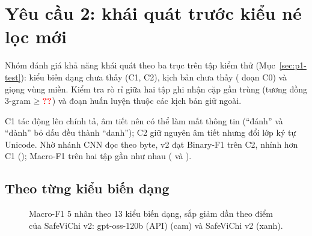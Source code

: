\section{Yêu cầu 2: khái quát trước kiểu né lọc mới}
\label{sec:yc2}

Nhóm đánh giá khả năng khái quát theo ba trục trên tập kiểm thử (Mục~\ref{sec:p1-test}): kiểu biến dạng chưa thấy
(C1, C2), kịch bản chưa thấy ( đoạn C0) và giọng vùng miền. Kiểm tra rò rỉ giữa hai tập ghi nhận  cặp gần trùng (tương đồng 3-gram $\ge \so{rr.nguong}$) và  đoạn
huấn luyện thuộc các kịch bản giữ ngoài.

C1 tác động lên chính tả, âm tiết nên có thể làm mất thông tin (``đánh'' và ``dành'' bỏ dấu đều thành ``danh''); C2
giữ nguyên âm tiết nhưng đổi lớp ký tự Unicode. Nhờ nhánh CNN đọc theo byte, v2 đạt Binary-F1  trên C2,
nhỉnh hơn C1 (); Macro-F1 trên hai tập gần như nhau ( và ).

\subsection{Theo từng kiểu biến dạng}

\begin{figure}[H]
\centering

\caption{Macro-F1 5 nhãn theo 13 kiểu biến dạng, sắp giảm dần theo điểm của SafeViChi v2: gpt-oss-120b (API) (cam) và
SafeViChi v2 (xanh).}
\label{fig:p3-kieu}
\end{figure}

